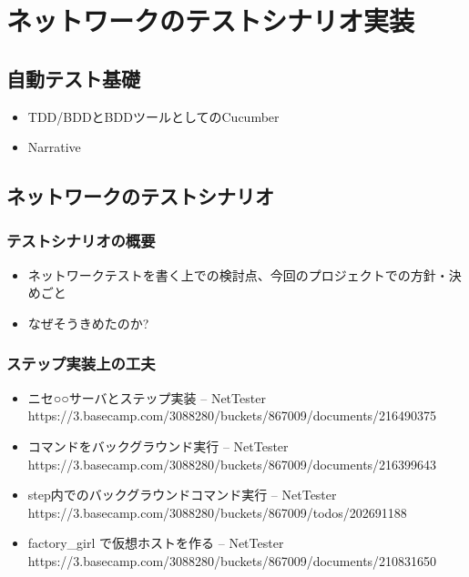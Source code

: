 
\chapter{ネットワークのテストシナリオ実装}

\section{自動テスト基礎}

\begin{itemize}
 \item TDD/BDDとBDDツールとしてのCucumber
 \item Narrative
\end{itemize}

\section{ネットワークのテストシナリオ}

\subsection{テストシナリオの概要}

\begin{itemize}
 \item ネットワークテストを書く上での検討点、今回のプロジェクトでの方針・決めごと
 \item なぜそうきめたのか?
\end{itemize}

\subsection{ステップ実装上の工夫}
\begin{itemize}
 \item ニセ○○サーバとステップ実装 – NetTester https://3.basecamp.com/3088280/buckets/867009/documents/216490375
 \item コマンドをバックグラウンド実行 – NetTester https://3.basecamp.com/3088280/buckets/867009/documents/216399643
 \item step内でのバックグラウンドコマンド実行 – NetTester https://3.basecamp.com/3088280/buckets/867009/todos/202691188
 \item factory\_girl で仮想ホストを作る – NetTester https://3.basecamp.com/3088280/buckets/867009/documents/210831650
\end{itemize}

